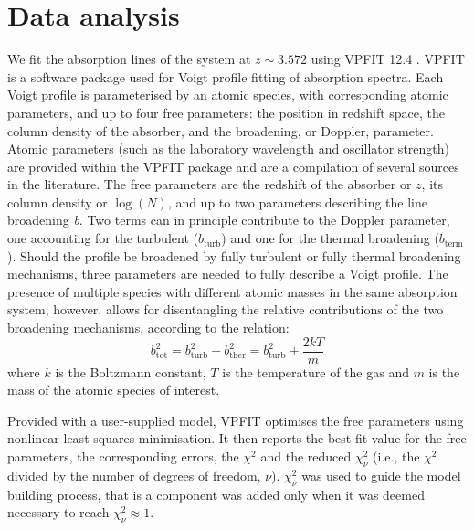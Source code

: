 \documentclass[fleqn,usenatbib]{mnras}
\begin{document}
\section{Data analysis}
\label{ref:mainModel}
We fit the absorption lines of the system at $z \sim 3.572$ using VPFIT 12.4 \citep{VPFIT}. VPFIT is a software package used for Voigt profile fitting of absorption spectra. Each Voigt profile is parameterised by an atomic species, with corresponding atomic parameters, and up to four free parameters: the position in redshift space, the column density of the absorber, and the broadening, or Doppler, parameter. Atomic parameters (such as the laboratory wavelength and oscillator strength) are provided within the VPFIT package and are a compilation of several sources in the literature. The free parameters are the redshift of the absorber or $z$, its column density or $\log(N)$, and up to two parameters describing the line broadening \textit{b}. Two terms can in principle contribute to the Doppler parameter, one accounting for the turbulent ($b_\mathrm{turb}$) and one for the thermal broadening ($b_\mathrm{term}$). Should the profile be broadened by fully turbulent or fully thermal broadening mechanisms, three parameters are needed to fully describe a Voigt profile. The presence of multiple species with different atomic masses in the same absorption system, however, allows for disentangling the relative contributions of the two broadening mechanisms, according to the relation:
\begin{equation}
    b_\mathrm{tot}^2 = b_\mathrm{turb}^2 + b_\mathrm{ther}^2 = b_\mathrm{turb}^2 + \frac{2kT}{m}
\end{equation}
where $k$ is the Boltzmann constant, $T$ is the temperature of the gas and $m$ is the mass of the atomic species of interest. 

Provided with a user-supplied model, VPFIT optimises the free parameters using nonlinear least squares minimisation. It then reports the best-fit value for the free parameters, the corresponding errors, the $\chi^2$ and the reduced $\chi_\nu^2$ (i.e., the $\chi^2$ divided by the number of degrees of freedom, $\nu$). $\chi^2_\nu$ was used to guide the model building process, that is a component was added only when it was deemed necessary to reach $\chi_\nu^2\approx1$.
\end{document}
